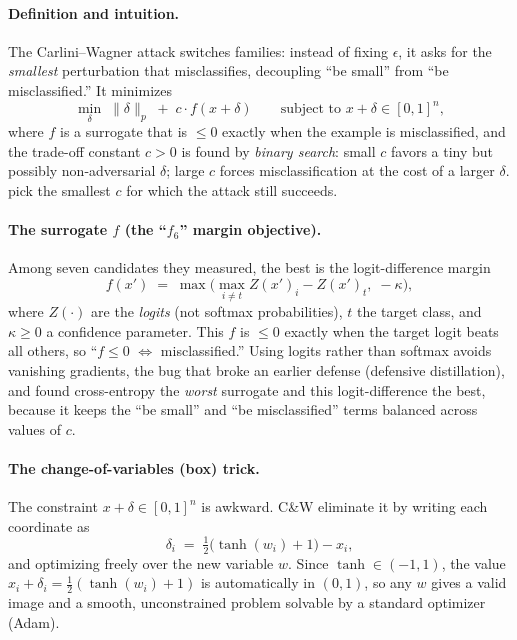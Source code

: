 \paragraph{Definition and intuition.} The Carlini--Wagner attack \citep{carlini2017towards} switches families: instead of fixing $\epsilon$, it asks for the \emph{smallest} perturbation that misclassifies, decoupling ``be small'' from ``be misclassified.'' It minimizes
\begin{equation}
  \label{eq:cw}
  \min_{\delta}\; \|\delta\|_p \;+\; c\cdot f(x+\delta)
  \qquad\text{subject to } x+\delta\in[0,1]^n,
\end{equation}
where $f$ is a surrogate that is $\le0$ exactly when the example is misclassified, and the trade-off constant $c>0$ is found by \emph{binary search}: small $c$ favors a tiny but possibly non-adversarial $\delta$; large $c$ forces misclassification at the cost of a larger $\delta$. \citet{carlini2017towards} pick the smallest $c$ for which the attack still succeeds.

\paragraph{The surrogate $f$ (the ``$f_6$'' margin objective).} Among seven candidates they measured, the best is the logit-difference margin
\[
  f(x') \;=\; \max\Big(\max_{i\neq t} Z(x')_i - Z(x')_t,\; -\kappa\Big),
\]
where $Z(\cdot)$ are the \emph{logits} (not softmax probabilities), $t$ the target class, and $\kappa\ge0$ a confidence parameter. This $f$ is $\le0$ exactly when the target logit beats all others, so ``$f\le0$ $\Leftrightarrow$ misclassified.'' Using logits rather than softmax avoids vanishing gradients, the bug that broke an earlier defense (defensive distillation), and \citet{carlini2017towards} found cross-entropy the \emph{worst} surrogate and this logit-difference the best, because it keeps the ``be small'' and ``be misclassified'' terms balanced across values of $c$.

\paragraph{The change-of-variables (box) trick.} The constraint $x+\delta\in[0,1]^n$ is awkward. C\&W eliminate it by writing each coordinate as
\[
  \delta_i \;=\; \tfrac12\big(\tanh(w_i)+1\big) - x_i ,
\]
and optimizing freely over the new variable $w$. Since $\tanh\in(-1,1)$, the value $x_i+\delta_i=\tfrac12(\tanh(w_i)+1)$ is automatically in $(0,1)$, so any $w$ gives a valid image and a smooth, unconstrained problem solvable by a standard optimizer (Adam).

